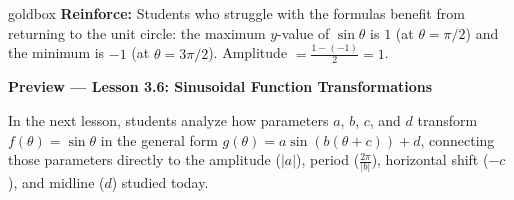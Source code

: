 \documentclass[10pt]{article}
\begin{document}
\begin{skillbox}{goldbox}
  \textbf{Reinforce:} Students who struggle with the formulas benefit from returning
  to the unit circle: the maximum $y$-value of $\sin\theta$ is $1$ (at
  $\theta=\pi/2$) and the minimum is $-1$ (at $\theta=3\pi/2$).
  Amplitude $= \tfrac{1-(-1)}{2} = 1$.

  \medskip
  \textbf{Preview --- Lesson 3.6: Sinusoidal Function Transformations}

  In the next lesson, students analyze how parameters $a$, $b$, $c$, and $d$
  transform $f(\theta)=\sin\theta$ in the general form
  $g(\theta) = a\sin(b(\theta+c))+d$, connecting those parameters directly to
  the amplitude ($|a|$), period ($\tfrac{2\pi}{|b|}$), horizontal shift ($-c$),
  and midline ($d$) studied today.
\end{skillbox}
\end{document}
